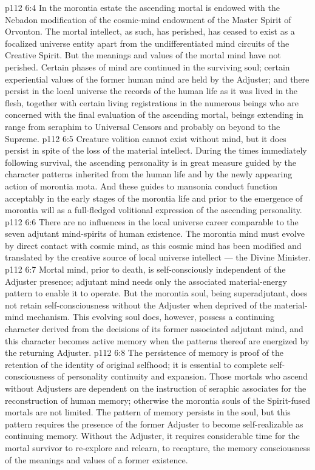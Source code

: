 \vs p112 6:4 \pc In the morontia estate the ascending mortal is endowed with the Nebadon modification of the cosmic\hyp{}mind endowment of the Master Spirit of Orvonton. The mortal intellect, as such, has perished, has ceased to exist as a focalized universe entity apart from the undifferentiated mind circuits of the Creative Spirit. But the meanings and values of the mortal mind have not perished. Certain phases of mind are continued in the surviving soul; certain experiential values of the former human mind are held by the Adjuster; and there persist in the local universe the records of the human life as it was lived in the flesh, together with certain living registrations in the numerous beings who are concerned with the final evaluation of the ascending mortal, beings extending in range from seraphim to Universal Censors and probably on beyond to the Supreme.
\vs p112 6:5 Creature volition cannot exist without mind, but it does persist in spite of the loss of the material intellect. During the times immediately following survival, the ascending personality is in great measure guided by the character patterns inherited from the human life and by the newly appearing action of morontia mota. And these guides to mansonia conduct function acceptably in the early stages of the morontia life and prior to the emergence of morontia will as a full\hyp{}fledged volitional expression of the ascending personality.
\vs p112 6:6 There are no influences in the local universe career comparable to the seven adjutant mind\hyp{}spirits of human existence. The morontia mind must evolve by direct contact with cosmic mind, as this cosmic mind has been modified and translated by the creative source of local universe intellect --- the Divine Minister.
\vs p112 6:7 \pc Mortal mind, prior to death, is self\hyp{}consciously independent of the Adjuster presence; adjutant mind needs only the associated material\hyp{}energy pattern to enable it to operate. But the morontia soul, being superadjutant, does not retain self\hyp{}consciousness without the Adjuster when deprived of the material\hyp{}mind mechanism. This evolving soul does, however, possess a continuing character derived from the decisions of its former associated adjutant mind, and this character becomes active memory when the patterns thereof are energized by the returning Adjuster.
\vs p112 6:8 The persistence of memory is proof of the retention of the identity of original selfhood; it is essential to complete self\hyp{}consciousness of personality continuity and expansion. Those mortals who ascend without Adjusters are dependent on the instruction of seraphic associates for the reconstruction of human memory; otherwise the morontia souls of the Spirit\hyp{}fused mortals are not limited. The pattern of memory persists in the soul, but this pattern requires the presence of the former Adjuster to become  self\hyp{}realizable as continuing memory. Without the Adjuster, it requires considerable time for the mortal survivor to re\hyp{}explore and relearn, to recapture, the memory consciousness of the meanings and values of a former existence.
